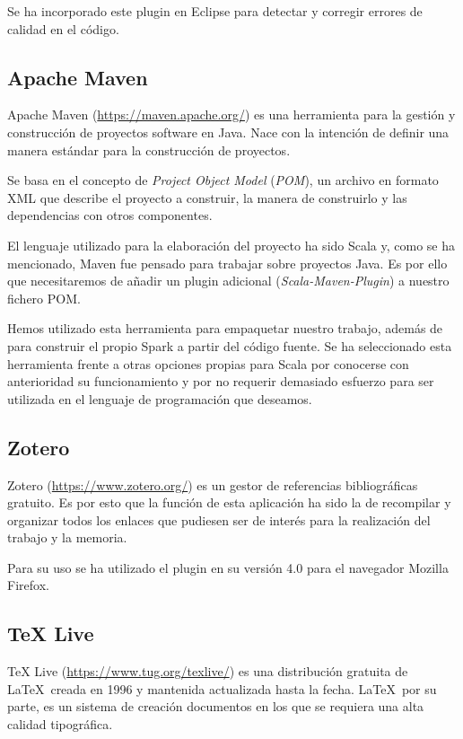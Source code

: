 Se ha incorporado este plugin en Eclipse para detectar y corregir errores de calidad en el código.


\subsection{Apache Maven}

Apache Maven (\url{https://maven.apache.org/}) es una herramienta para la gestión y construcción de proyectos software en Java. Nace con la intención de definir una manera estándar para la construcción de proyectos.

Se basa en el concepto de \textit{Project Object Model} (\textit{POM}), un archivo en formato XML que describe el proyecto a construir, la manera de construirlo y  las dependencias con otros componentes.

El lenguaje utilizado para la elaboración del proyecto ha sido Scala y, como se ha mencionado, Maven fue pensado para trabajar sobre proyectos Java. Es por ello que necesitaremos de añadir un plugin adicional (\textit{Scala-Maven-Plugin}) a nuestro fichero POM.

Hemos utilizado esta herramienta para empaquetar nuestro trabajo, además de para construir el propio Spark a partir del código fuente. Se ha seleccionado esta herramienta frente a otras opciones propias para Scala por conocerse con anterioridad su funcionamiento y por no requerir demasiado esfuerzo para ser utilizada en el lenguaje de programación que deseamos.


\subsection{Zotero}
Zotero (\url{https://www.zotero.org/}) es un gestor de referencias bibliográficas gratuito. Es por esto que la función de esta aplicación ha sido la de recompilar y organizar todos los enlaces que pudiesen ser de interés para la realización del trabajo y la memoria.

Para su uso se ha utilizado el plugin en su versión 4.0 para el navegador Mozilla Firefox.

\subsection{TeX Live}
TeX Live (\url{https://www.tug.org/texlive/}) es una distribución gratuita de \LaTeX\ creada en 1996 y mantenida actualizada hasta la fecha. \LaTeX\, por su parte, es un sistema de creación documentos en los que se requiera una alta calidad tipográfica.

